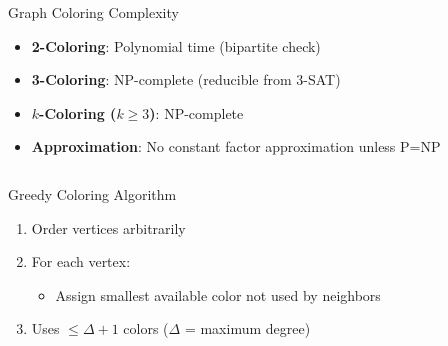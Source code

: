 \documentclass{beamer}
\begin{document}
\begin{frame}{Graph Coloring Complexity}
    \textbf{\color{myred}{Theoretical Status}}
        \begin{itemize}
            \item \textbf{2-Coloring}: Polynomial time (bipartite check)
            \item \textbf{3-Coloring}: NP-complete (reducible from 3-SAT)
            \item \textbf{$k$-Coloring ($k \geq 3$)}: NP-complete
            \item \textbf{Approximation}: No constant factor approximation unless P=NP
        \end{itemize}
    
    \begin{columns}[T]
        \begin{column}{0.6\textwidth}
            \begin{exampleblock}{Greedy Coloring Algorithm}
                \begin{enumerate}
                    \item Order vertices arbitrarily
                    \item For each vertex:
                    \begin{itemize}
                        \item Assign smallest available color not used by neighbors
                    \end{itemize}
                    \item Uses $\leq \Delta+1$ colors ($\Delta$ = maximum degree)
                \end{enumerate}
            \end{exampleblock}
        \end{column}
        
        \begin{column}{0.4\textwidth}
            \begin{center}
            \end{center}
        {\singlespacing}
        \textbf{\color{myred}{Brooks' Theorem:}} \\
        \color{black}{Any connected graph is $\Delta$-colorable, except complete graphs and odd cycles}
        \end{column}
    \end{columns}
\end{frame}
\end{document}
